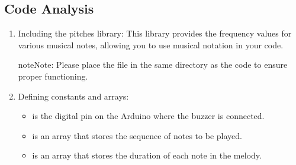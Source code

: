 \documentclass[a4paper,11pt,english]{sphinxmanual}
\begin{document}
\subsection{Code Analysis}
\label{\detokenize{Basic_Project/Passive_Buzzer:code-analysis}}\begin{enumerate}
%
\item {} 
\sphinxAtStartPar
Including the pitches library:
This library provides the frequency values for various musical notes, allowing you to use musical notation in your code.

\begin{sphinxadmonition}{note}{Note:}
\sphinxAtStartPar
Please place the  file in the same directory as the code to ensure proper functioning. 

\noindent{}
\end{sphinxadmonition}

\begin{sphinxVerbatim}[commandchars=\\\{\}]
\end{sphinxVerbatim}

\item {} 
\sphinxAtStartPar
Defining constants and arrays:
\begin{itemize}
\item {} 
\sphinxAtStartPar
{} is the digital pin on the Arduino where the buzzer is connected.

\item {} 
\sphinxAtStartPar
{} is an array that stores the sequence of notes to be played.

\item {} 
\sphinxAtStartPar
{} is an array that stores the duration of each note in the melody.

\end{itemize}


\end{enumerate}
\end{document}
